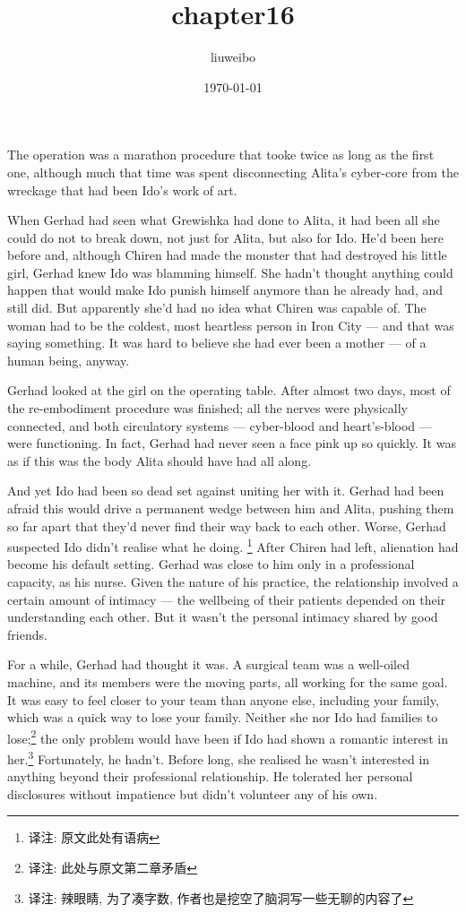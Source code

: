 \documentclass[11pt]{article}
\author{liuweibo}
\date{\today}
\title{chapter16}
\begin{document}
\maketitle
\tableofcontents

The operation was a marathon procedure that tooke twice as long as the first one, although much that time was spent disconnecting Alita's cyber-core from the wreckage that had been Ido's work of art.

When Gerhad had seen what Grewishka had done to Alita, it had been all she could do not to break down, not just for Alita, but also for Ido. He'd been here before and, although Chiren had made the monster that had destroyed his little girl, Gerhad knew Ido was blamming himself. She hadn't thought anything could happen that would make Ido punish himself anymore than he already had, and still did. But apparently she'd had no idea what Chiren was capable of. The woman had to be the coldest, most heartless person in Iron City --- and that was saying something. It was hard to believe she had ever been a mother --- of a human being, anyway.

Gerhad looked at the girl on the operating table. After almost two days, most of the re-embodiment procedure was finished; all the nerves were physically connected, and both circulatory systems --- cyber-blood and heart's-blood --- were functioning. In fact, Gerhad had never seen a face pink up so quickly. It was as if this was the body Alita should have had all along.

And yet Ido had been so dead set against uniting her with it. Gerhad had been afraid this would drive a permanent wedge between him and Alita, pushing them so far apart that they'd never find their way back to each other. Worse, Gerhad suspected Ido didn't realise what he doing. \footnote{译注: 原文此处有语病} After Chiren had left, alienation had become his default setting. Gerhad was close to him only in a professional capacity, as his nurse. Given the nature of his practice, the relationship involved a certain amount of intimacy --- the wellbeing of their patients depended on their understanding each other. But it wasn't the personal intimacy shared by good friends.

For a while, Gerhad had thought it was. A surgical team was a well-oiled machine, and its members were the moving parts, all working for the same goal. It was easy to feel closer to your team than anyone else, including your family, which was a quick way to lose your family. Neither she nor Ido had families to lose;\footnote{译注: 此处与原文第二章矛盾} the only problem would have been if Ido had shown a romantic interest in her.\footnote{译注: 辣眼睛, 为了凑字数, 作者也是挖空了脑洞写一些无聊的内容了} Fortunately, he hadn't. Before long, she realised he wasn't interested in anything beyond their professional relationship. He tolerated her personal disclosures without impatience but didn't volunteer any of his own.
\end{document}
